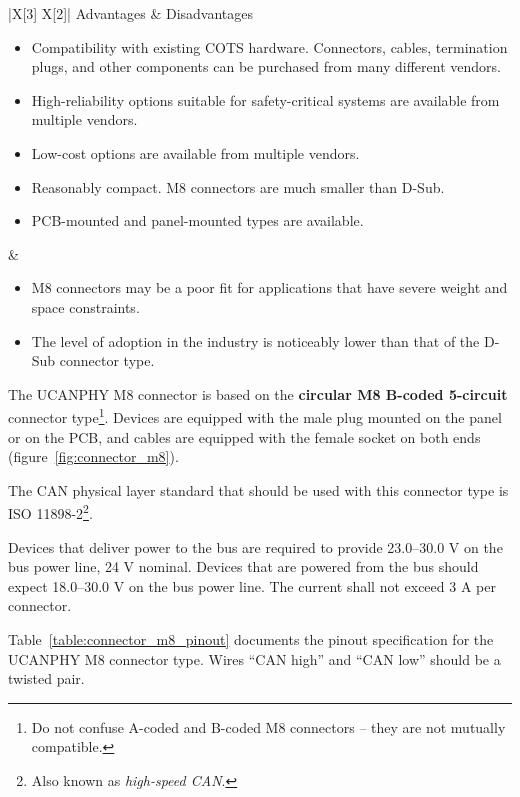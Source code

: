 {
\NoLeftSkip
\begin{UAVCANCompactTable}{|X[3] X[2]|}
    Advantages & Disadvantages \\
    \begin{itemize}
        \item Compatibility with existing COTS hardware.
        Connectors, cables, termination plugs, and other components can be purchased from many different vendors.
        \item High-reliability options suitable for safety-critical systems are available from multiple vendors.
        \item Low-cost options are available from multiple vendors.
        \item Reasonably compact. M8 connectors are much smaller than D-Sub.
        \item PCB-mounted and panel-mounted types are available.
    \end{itemize}
    &
    \begin{itemize}
        \item M8 connectors may be a poor fit for applications that have severe weight and space constraints.
        \item The level of adoption in the industry is noticeably lower than that of the D-Sub connector type.
    \end{itemize}
\end{UAVCANCompactTable}
}

The UCANPHY M8 connector is based on the \textbf{circular M8 B-coded 5-circuit} connector type\footnote{%
    Do not confuse A-coded and B-coded M8 connectors -- they are not mutually compatible.
}.
Devices are equipped with the male plug mounted on the panel or on the PCB,
and cables are equipped with the female socket on both ends (figure~\ref{fig:connector_m8}).

The CAN physical layer standard that should be used with this connector type is
ISO 11898-2\footnote{Also known as \emph{high-speed CAN}.}.

Devices that deliver power to the bus are required to provide 23.0--30.0 V on the bus power line, 24 V nominal.
Devices that are powered from the bus should expect 18.0--30.0 V on the bus power line.
The current shall not exceed 3 A per connector.

Table~\ref{table:connector_m8_pinout} documents the pinout specification for the UCANPHY M8 connector type.
Wires ``CAN high'' and ``CAN low'' should be a twisted pair.

